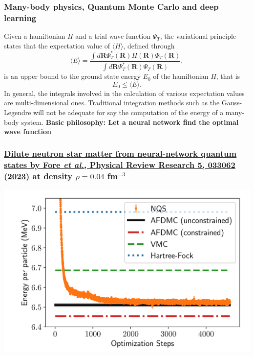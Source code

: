 \documentclass{beamer}
\begin{document}
\begin{frame}
\frametitle{Many-body physics, Quantum Monte Carlo and deep learning}

\begin{block}{}
Given a hamiltonian $H$ and a trial wave function $\Psi_T$, the variational principle states that the expectation value of $\langle H \rangle$, defined through 
\[
   \langle E \rangle =
   \frac{\int d\bm{R}\Psi^{\ast}_T(\bm{R})H(\bm{R})\Psi_T(\bm{R})}
        {\int d\bm{R}\Psi^{\ast}_T(\bm{R})\Psi_T(\bm{R})},
\]
is an upper bound to the ground state energy $E_0$ of the hamiltonian $H$, that is 
\[
    E_0 \le \langle E \rangle.
\]
In general, the integrals involved in the calculation of various  expectation values  are multi-dimensional ones. Traditional integration methods such as the Gauss-Legendre will not be adequate for say the  computation of the energy of a many-body system.  \textbf{Basic philosophy: Let a neural network find the optimal wave function}
\end{block}
\end{frame}





\begin{frame}
\frametitle{\href{{https://journals.aps.org/prresearch/pdf/10.1103/PhysRevResearch.5.033062}}{Dilute neutron star matter from neural-network quantum states by Fore {\em et al.}, Physical Review Research 5, 033062 (2023)} at density $\rho=0.04$ fm$^{-3}$}

\centerline{\includegraphics[width=0.9\linewidth]{figures/nmatter.png}}

\end{frame}
\end{document}
